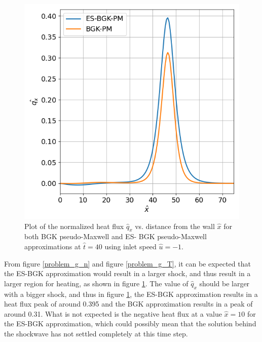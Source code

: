 \documentclass[a4paper]{article}
\begin{document}
\begin{figure}[hbt!]
    \centering
    \includegraphics[width=14cm]{plots/problem_g_q_x.png}
    \caption{\centering Plot of the normalized heat flux $\hat{q}_x$ vs. distance from the wall $\hat{x}$ for both BGK pseudo-Maxwell and ES- BGK pseudo-Maxwell approximations at $\hat{t} = 40$ using inlet speed $\hat{u} = -1$.}
    \label{problem_g_q_x}
\end{figure}
From figure \ref{problem_g_n} and figure \ref{problem_g_T}, it can be expected that the ES-BGK approximation would result in a larger shock, and thus result in a larger region for heating, as shown in figure \ref{problem_g_q_x}. The value of $\hat{q}_x$ should be larger with a bigger shock, and thus in figure \ref{problem_g_q_x}, the ES-BGK approximation results in a heat flux peak of around 0.395 and the BGK approximation results in a peak of around 0.31. What is not expected is the negative heat flux at a value $\hat{x} = 10$ for the ES-BGK approximation, which could possibly mean that the solution behind the shockwave has not settled completely at this time step. 
\clearpage
\end{document}
